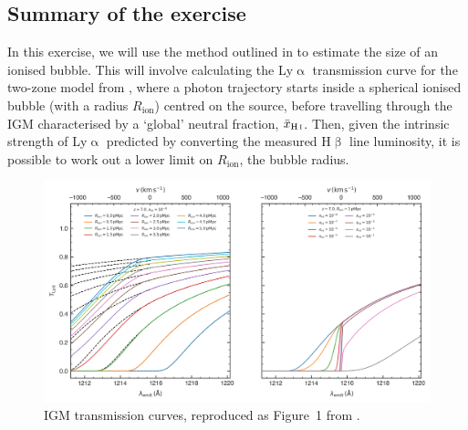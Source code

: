 \documentclass{article}
\newcommand{\Lya}{{Ly\ensuremath{\upalpha}}\xspace}
\newcommand{\HI}{\hbox{H\,{\sc i}}\xspace}
\newcommand{\Hbeta}{\ensuremath{\mathrm{H}\upbeta}\xspace}
\theoremstyle{definition}
\begin{document}
\subsection{Summary of the exercise}

In this exercise, we will use the method outlined in \citet{2024A&A...682A..40W} to estimate the size of an ionised bubble. This will involve calculating the \Lya transmission curve for the two-zone model from \citet{2020MNRAS.499.1395M}, where a photon trajectory starts inside a spherical ionised bubble (with a radius $R_\text{ion}$) centred on the source, before travelling through the IGM characterised by a `global' neutral fraction, $\bar{x}_\text{\HI}$. Then, given the intrinsic strength of \Lya predicted by converting the measured \Hbeta line luminosity, it is possible to work out a lower limit on $R_\text{ion}$, the bubble radius.
\begin{figure}
	\centering
	\includegraphics[width=\linewidth]{"Lya_bubble_transmission"}
	\caption{IGM transmission curves, reproduced as Figure~1 from \citet{2020MNRAS.499.1395M}.
	}
	\label{fig:IGM_transmission}
\end{figure}
\end{document}
